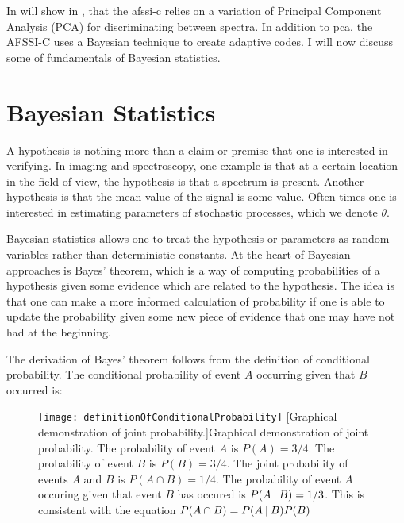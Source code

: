 In will show in , that the \gls{afssi-c} relies on a variation of Principal Component Analysis (PCA) for discriminating between spectra. In addition to \gls{pca}, the AFSSI-C uses a Bayesian technique to create adaptive codes. I will now discuss some of fundamentals of Bayesian statistics. 

\section{Bayesian Statistics}

A hypothesis is nothing more than a claim or premise that one is interested in verifying. In imaging and spectroscopy, one example is that at a certain location in the field of view, the hypothesis is that a spectrum is present. Another hypothesis is that the mean value of the signal is some value. Often times one is interested in estimating parameters of stochastic processes, which we denote $\theta$. 

Bayesian statistics allows one to treat the hypothesis or parameters as random variables rather than deterministic constants. At the heart of Bayesian approaches is Bayes' theorem, which is a way of computing probabilities of a hypothesis given some evidence which are related to the hypothesis. The idea is that one  can make a more informed calculation of probability if one is able to update the probability given some new piece of evidence that one may have not had at the beginning.

The derivation of Bayes' theorem follows from the definition of conditional probability. The conditional probability of event $A$ occurring given that $B$ occurred is:

\begin{figure}
	\texttt{[image: definitionOfConditionalProbability]}
	[Graphical demonstration of joint probability.]{Graphical demonstration of joint probability. The probability of event $A$ is $P(A)=3/4$. The probability of event $B$ is $P(B)=3/4$. The joint probability of events $A$ and $B$ is $P(A \cap B) = 1/4$. The probability of event $A$ occuring given that event $B$ has occured is $P( A \:\vert\: B) = 1/3$. This is consistent with the equation $ P(A \cap B) = P(A \:\vert\: B) P(B) $}
	\label{fig:definitionOfConditionalProbability}
\end{figure}

